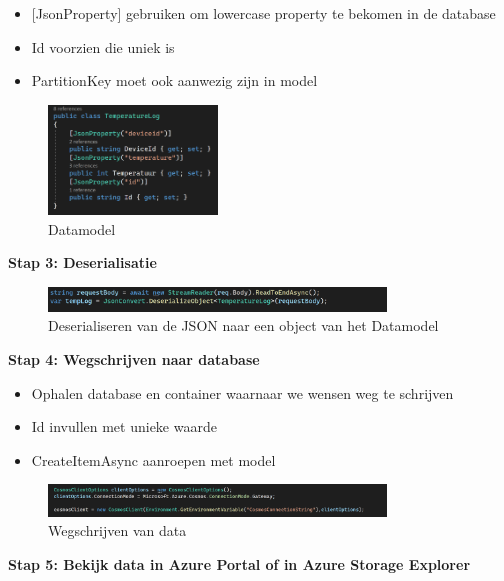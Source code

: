 \documentclass{article}
\newcommand{\bold}[1]{\textbf{#1}}
\begin{document}
\begin{itemize}
    \item {[JsonProperty]} gebruiken om lowercase property te bekomen in de database
    \item Id voorzien die uniek is
    \item PartitionKey moet ook aanwezig zijn in model
\end{itemize}

\begin{figure}[H]
    \centering
    \includegraphics[width=0.4\textwidth]{cosmosdb-stap2.png}
    \caption{Datamodel}
\end{figure}


\bold{Stap 3: Deserialisatie}

\begin{figure}[H]
    \centering
    \includegraphics[width=0.8\textwidth]{cosmosdb-stap3.png}
    \caption{Deserialiseren van de JSON naar een object van het Datamodel}
\end{figure}


\bold{Stap 4: Wegschrijven naar database}

\begin{itemize}
    \item Ophalen database en container waarnaar we wensen weg te schrijven
    \item Id invullen met unieke waarde
    \item CreateItemAsync aanroepen met model
\end{itemize}

\begin{figure}[H]
    \centering
    \includegraphics[width=0.8\textwidth]{cosmosdb-stap1.png}
    \caption{Wegschrijven van data}
\end{figure}


\bold{Stap 5: Bekijk data in Azure Portal of in Azure Storage Explorer}
\end{document}

